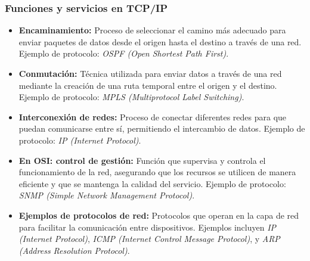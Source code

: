 \documentclass[a4paper,12pt]{article}
\begin{document}
\subsubsection{Funciones y servicios en TCP/IP}
\begin{itemize}
    \item \textbf{Encaminamiento:} Proceso de seleccionar el camino más adecuado para enviar paquetes de datos desde el origen hasta el destino a través de una red. Ejemplo de protocolo: \textit{OSPF (Open Shortest Path First)}.
    \item \textbf{Conmutación:} Técnica utilizada para enviar datos a través de una red mediante la creación de una ruta temporal entre el origen y el destino. Ejemplo de protocolo: \textit{MPLS (Multiprotocol Label Switching)}.
    \item \textbf{Interconexión de redes:} Proceso de conectar diferentes redes para que puedan comunicarse entre sí, permitiendo el intercambio de datos. Ejemplo de protocolo: \textit{IP (Internet Protocol)}.
    \item \textbf{En OSI: control de gestión:} Función que supervisa y controla el funcionamiento de la red, asegurando que los recursos se utilicen de manera eficiente y que se mantenga la calidad del servicio. Ejemplo de protocolo: \textit{SNMP (Simple Network Management Protocol)}.
    \item \textbf{Ejemplos de protocolos de red:} Protocolos que operan en la capa de red para facilitar la comunicación entre dispositivos. Ejemplos incluyen \textit{IP (Internet Protocol)}, \textit{ICMP (Internet Control Message Protocol)}, y \textit{ARP (Address Resolution Protocol)}.
\end{itemize}



\end{document}
